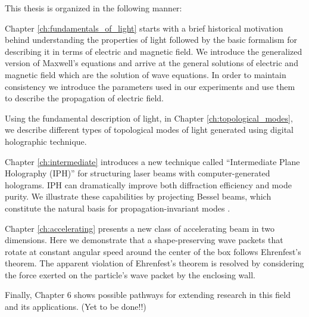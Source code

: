 This thesis is organized in the following manner:

Chapter \ref{ch:fundamentals_of_light} starts with a brief historical motivation behind understanding the properties of light followed by the basic formalism for describing it in terms of electric and magnetic field. We introduce the generalized version of Maxwell's equations and arrive at the general solutions of electric and magnetic field which are the solution of wave equations. In order to maintain consistency we introduce the parameters used in our experiments and use them to describe the propagation of electric field. 

Using the fundamental description of light, in Chapter \ref{ch:topological_modes}, we describe different types of topological modes of light generated using digital holographic technique.

Chapter \ref{ch:intermediate} introduces a new technique called ``Intermediate Plane Holography (IPH)''  for structuring laser beams with computer-generated holograms. IPH can dramatically improve both diffraction efficiency and mode purity. We illustrate these capabilities by projecting Bessel beams, which constitute the natural basis for propagation-invariant modes \cite{durnin87,durnin87a}.

Chapter \ref{ch:accelerating} presents a new class of accelerating beam in two dimensions. Here we demonstrate that a shape-preserving wave packets that rotate at constant angular speed around the center of the box follows Ehrenfest's theorem. The apparent violation of Ehrenfest’s theorem is resolved by considering the force exerted on the particle’s wave packet by the enclosing wall.

Finally, Chapter 6 shows possible pathways for extending research in this field and its applications. (Yet to be done!!)

